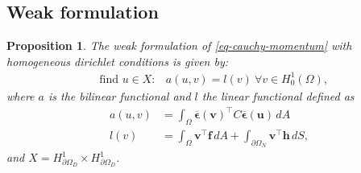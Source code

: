 \documentclass[a4paper,english]{elsarticle}%
\newtheorem{proposition}[theorem]{Proposition}
\begin{document}
\subsection{Weak formulation}
\begin{proposition} \label{prop-weak-eleastic}
    The weak formulation of \eqref{eq-cauchy-momentum} with homogeneous dirichlet conditions is given by:  
    \begin{equation*}
        \begin{aligned}
        &\text{find } u \in X : 
        &a(u,v) = l(v) \ \forall v \in H_0^{1}(\Omega), 
        \label{weak_formulation_elastic}
        \end{aligned}
    \end{equation*}
    where $a$ is the bilinear functional and $l$ the linear functional defined as 
    \begin{equation*}
        \begin{aligned}
            a(u,v) &= \int_{\Omega} \boldsymbol{\overline \epsilon}(\boldsymbol v)^\intercal C\boldsymbol{\overline \epsilon}(\boldsymbol u)  \, dA
            \\
            l(v) &= \int_\Omega{\boldsymbol{v}^\intercal \boldsymbol{f}} \,dA  + \int_{\partial \Omega_N}{\boldsymbol{v}^\intercal \boldsymbol h} \,dS,
        \end{aligned}
    \end{equation*}
    and $ X=   H^1_{\partial \Omega_D } \times H^1_{\partial \Omega_D } $.
\end{proposition}
\end{document}
